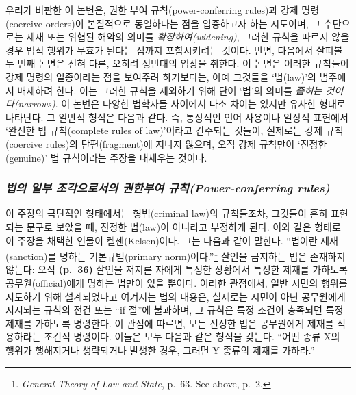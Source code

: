 \documentclass[12pt, oneside]{book}  %
\begin{document}
우리가 비판한 이 논변은, 권한 부여 규칙(power-conferring rules)과 강제
명령(coercive orders)이 본질적으로 동일하다는 점을 입증하고자 하는
시도이며, 그 수단으로는 제재 또는 위협된 해악의 의미를
\emph{확장하여(widening)}, 그러한 규칙을 따르지 않을 경우 법적 행위가
무효가 된다는 점까지 포함시키려는 것이다. 반면, 다음에서 살펴볼 두 번째
논변은 전혀 다른, 오히려 정반대의 입장을 취한다. 이 논변은 이러한
규칙들이 강제 명령의 일종이라는 점을 보여주려 하기보다는, 아예 그것들을
`법(law)'의 범주에서 배제하려 한다. 이는 그러한 규칙을 제외하기 위해
단어 `법'의 의미를 \emph{좁히는 것이다(narrows)}. 이 논변은 다양한
법학자들 사이에서 다소 차이는 있지만 유사한 형태로 나타난다. 그 일반적
형식은 다음과 같다. 즉, 통상적인 언어 사용이나 일상적 표현에서 `완전한
법 규칙(complete rules of law)'이라고 간주되는 것들이, 실제로는 강제
규칙(coercive rules)의 단편(fragment)에 지나지 않으며, 오직 강제
규칙만이 `진정한(genuine)' 법 규칙이라는 주장을 내세우는 것이다.

\subsubsection{\texorpdfstring{\emph{법의 일부 조각으로서의 권한부여
규칙(Power-conferring
rules)}}{법의 일부 조각으로서의 권한부여 규칙(Power-conferring rules)}}\label{uxbc95uxc758-uxc77cuxbd80-uxc870uxac01uxc73cuxb85cuxc11cuxc758-uxad8cuxd55cuxbd80uxc5ec-uxaddcuxce59power-conferring-rules}

이 주장의 극단적인 형태에서는 형법(criminal law)의 규칙들조차, 그것들이
흔히 표현되는 문구로 보았을 때, 진정한 법(law)이 아니라고 부정하게 된다.
이와 같은 형태로 이 주장을 채택한 인물이 켈젠(Kelsen)이다. 그는 다음과
같이 말한다. ``법이란 제재(sanction)를 명하는 기본규범(primary
norm)이다.''\footnote{\emph{General Theory of Law and State}, p.~63. See
  above, p.~2.} 살인을 금지하는 법은 존재하지 않는다: 오직
\textbf{(p.~36)} 살인을 저지른 자에게 특정한 상황에서 특정한 제재를
가하도록 공무원(official)에게 명하는 법만이 있을 뿐이다. 이러한
관점에서, 일반 시민의 행위를 지도하기 위해 설계되었다고 여겨지는 법의
내용은, 실제로는 시민이 아닌 공무원에게 지시되는 규칙의 전건 또는
``if-절''에 불과하며, 그 규칙은 특정 조건이 충족되면 특정 제재를
가하도록 명령한다. 이 관점에 따르면, 모든 진정한 법은 공무원에게 제재를
적용하라는 조건적 명령이다. 이들은 모두 다음과 같은 형식을 갖는다.
``어떤 종류 X의 행위가 행해지거나 생략되거나 발생한 경우, 그러면 Y
종류의 제재를 가하라.''
\end{document}
